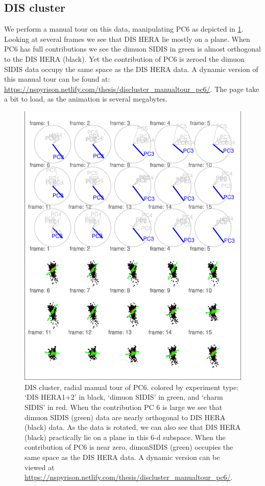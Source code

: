 \documentclass{monashthesis}
\begin{document}
\hypertarget{dis-cluster}{%
\subsection{DIS cluster}\label{dis-cluster}}

We perform a manual tour on this data, manipulating PC6 as depicted in \ref{fig:DISclusterGood}. Looking at several frames we see that DIS HERA lie mostly on a plane. When PC6 has full contributions we see the dimuon SIDIS in green is almost orthogonal to the DIS HERA (black). Yet the contribution of PC6 is zeroed the dimuon SIDIS data occupy the same space as the DIS HERA data. A dynamic version of this manual tour can be found at:
\url{https://nspyrison.netlify.com/thesis/discluster_manualtour_pc6/}.
The page take a bit to load, as the animation is several megabytes.

\begin{figure}
\centering
\includegraphics{thesis_files/figure-latex/DISclusterGood-1.pdf}
\caption{\label{fig:DISclusterGood}DIS cluster, radial manual tour of PC6. colored by experiment type: `DIS HERA1+2' in black, `dimuon SIDIS' in green, and `charm SIDIS' in red. When the contribution PC 6 is large we see that dimuon SIDIS (green) data are nearly orthogonal to DIS HERA (black) data. As the data is rotated, we can also see that DIS HERA (black) practically lie on a plane in this 6-d subspace. When the contribution of PC6 is near zero, dimonSIDIS (green) occupies the same space as the DIS HERA data. A dynamic version can be viewed at \url{https://nspyrison.netlify.com/thesis/discluster_manualtour_pc6/}.}
\end{figure}
\end{document}
